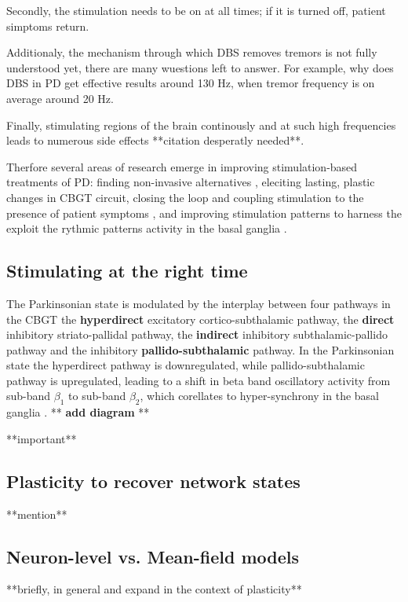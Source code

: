 Secondly, the stimulation needs to be on at all times; if it is turned off, patient simptoms
return.

Additionaly, the mechanism through which DBS removes tremors is not fully understood yet, there
are many wuestions left to answer. For example, why does DBS in PD get effective results around
130 Hz, when tremor frequency is on average around 20 Hz.

Finally, stimulating regions of the brain continously and at such high frequencies leads to
numerous side effects **citation desperatly needed**.

Therfore several areas of research emerge in improving stimulation-based treatments of PD:
finding non-invasive alternatives \cite{saturnino2017target, schwab2020spike}, eleciting lasting,
plastic changes in CBGT circuit, closing the loop and coupling stimulation to the presence of
patient symptoms \cite{beudel2018adaptive}, and improving stimulation patterns to harness the
exploit the rythmic patterns activity in the basal ganglia \cite{cagnan2017stimulating, west2022stimulating}.

\subsection{Stimulating at the right time}
The Parkinsonian state is modulated by the interplay between four pathways in the CBGT
the \textbf{hyperdirect} excitatory cortico-subthalamic pathway,
the \textbf{direct} inhibitory striato-pallidal pathway,
the \textbf{indirect} inhibitory subthalamic-pallido pathway and
the inhibitory \textbf{pallido-subthalamic} pathway. In the Parkinsonian state the hyperdirect
pathway is downregulated, while pallido-subthalamic pathway is upregulated, leading to a shift in
beta band oscillatory activity from sub-band $\beta_1$ to sub-band $\beta_2$, which corellates to
hyper-synchrony in the basal ganglia \cite{west2022stimulating}.
** \textbf{add diagram} **

**important** \cite{cagnan2017stimulating} \cite{beudel2018adaptive} \cite{west2022stimulating}

\subsection{Plasticity to recover network states}
**mention** \cite{lebedev2017brain} \cite{cramer2011harnessing}

\subsection{Neuron-level vs. Mean-field models}
**briefly, in general and expand in the context of plasticity**

